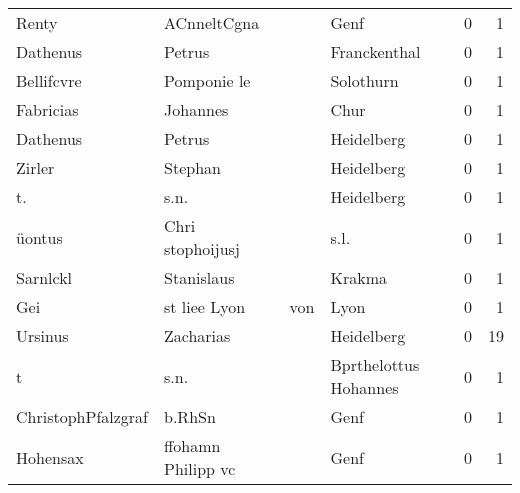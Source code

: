 \begin{center}
\begin{tiny}
\begin{longtabu}{llllrr}
                    Renty &                        ACnneltCgna &             &                                        Genf &          0 &         1 \\
                 Dathenus &                             Petrus &             &                                Franckenthal &          0 &         1 \\
               Bellifcvre &                        Pomponie le &             &                                   Solothurn &          0 &         1 \\
                Fabricias &                           Johannes &             &                                        Chur &          0 &         1 \\
                 Dathenus &                             Petrus &             &                                  Heidelberg &          0 &         1 \\
                   Zirler &                            Stephan &             &                                  Heidelberg &          0 &         1 \\
                       t. &                               s.n. &             &                                  Heidelberg &          0 &         1 \\
                   üontus &                   Chri stophoijusj &             &                                        s.l. &          0 &         1 \\
                 Sarnlckl &                         Stanislaus &             &                                      Krakma &          0 &         1 \\
                      Gei &                      st liee  Lyon &         von &                                        Lyon &          0 &         1 \\
                  Ursinus &                          Zacharias &             &                                  Heidelberg &          0 &        19 \\
                        t &                               s.n. &             &                       Bprthelottus Hohannes &          0 &         1 \\
       ChristophPfalzgraf &                             b.RhSn &             &                                        Genf &          0 &         1 \\
                 Hohensax &                 ffohamn Philipp vc &             &                                        Genf &          0 &         1 \\

\end{longtabu}
\end{tiny}
\end{center}
